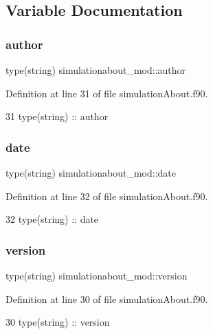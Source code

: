 \subsection{Variable Documentation}
\mbox{\label{namespacesimulationabout__mod_a64b9a218dda33c3c5abdf4503b71e8a4}} 
\subsubsection{\texorpdfstring{author}{author}}
{\footnotesize\ttfamily type(string) simulationabout\+\_\+mod\+::author\hspace{0.3cm}{\ttfamily [private]}}



Definition at line 31 of file simulation\+About.\+f90.


\begin{DoxyCode}
31     \textcolor{keywordtype}{type}(string) :: author
\end{DoxyCode}
\mbox{\label{namespacesimulationabout__mod_ab8debffcb94d9718e06501a71218ef26}} 
\subsubsection{\texorpdfstring{date}{date}}
{\footnotesize\ttfamily type(string) simulationabout\+\_\+mod\+::date\hspace{0.3cm}{\ttfamily [private]}}



Definition at line 32 of file simulation\+About.\+f90.


\begin{DoxyCode}
32     \textcolor{keywordtype}{type}(string) :: date
\end{DoxyCode}
\mbox{\label{namespacesimulationabout__mod_ab3a538e4f741e6ea5be60e667a966fda}} 
\subsubsection{\texorpdfstring{version}{version}}
{\footnotesize\ttfamily type(string) simulationabout\+\_\+mod\+::version\hspace{0.3cm}{\ttfamily [private]}}



Definition at line 30 of file simulation\+About.\+f90.


\begin{DoxyCode}
30     \textcolor{keywordtype}{type}(string) :: version
\end{DoxyCode}
